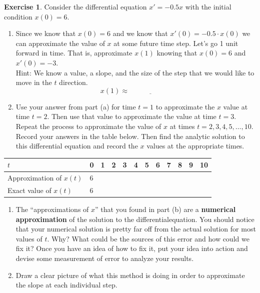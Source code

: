 \documentclass[
]{book}
\theoremstyle{definition}
\theoremstyle{definition}
\theoremstyle{definition}
\newtheorem{exercise}{Exercise}[chapter]
\theoremstyle{remark}
\begin{document}
\begin{exercise}
\protect\hypertarget{exr:euler-motivation}{}{\label{exr:euler-motivation} }Consider the differential equation \(x' = -0.5x\) with the initial condition \(x(0) = 6\).

\begin{enumerate}
\def\labelenumi{\alph{enumi}.}
\item
  Since we know that \(x(0) = 6\) and we know that \(x'(0) = -0.5 \cdot x(0)\) we can approximate the value of \(x\) at some future time step. Let's go 1 unit forward in time. That is, approximate \(x(1)\) knowing that \(x(0) = 6\) and \(x'(0) = -3\).\\
  Hint: We know a value, a slope, and the size of the step that we would like to move in the \(t\) direction.
  \[x(1) \approx \underline{\hspace{1in}}\]
\item
  Use your answer from part (a) for time \(t=1\) to approximate the \(x\) value at time \(t=2\). Then use that value to approximate the value at time \(t=3\). Repeat the process to approximate the value of \(x\) at times \(t=2, 3, 4, 5, \ldots, 10\). Record your answers in the table below. Then find the analytic solution to this differential equation and record the \(x\) values at the appropriate times.
\end{enumerate}

\begin{longtable}[]{@{}llllllllllll@{}}
\toprule
\(t\) & 0 & 1 & 2 & 3 & 4 & 5 & 6 & 7 & 8 & 9 & 10\tabularnewline
\midrule
\endhead
Approximation of \(x(t)\) & 6 & & & & & & & & & &\tabularnewline
Exact value of \(x(t)\) & 6 & & & & & & & & & &\tabularnewline
\bottomrule
\end{longtable}

\begin{enumerate}
\def\labelenumi{\alph{enumi}.}
\setcounter{enumi}{2}
\item
  The ``approximations of \(x\)'' that you found in part (b) are a \textbf{numerical approximation} of the solution to the differentialequation. You should notice that your numerical solution is pretty far off from the actual solution for most values of \(t\). Why? What could be the sources of this error and how could we fix it? Once you have an idea of how to fix it, put your idea into action and devise some measurement of error to analyze your results.
\item
  Draw a clear picture of what this method is doing in order to approximate the slope at each individual step.
\end{enumerate}
\end{exercise}
\end{document}
